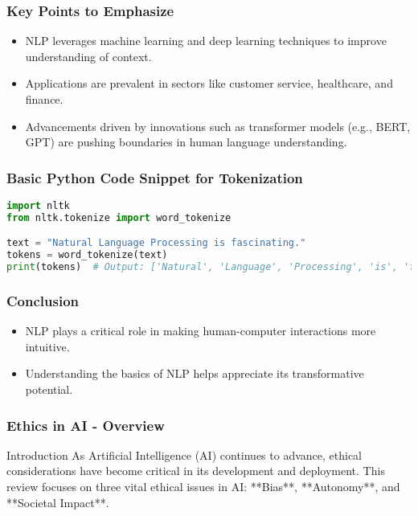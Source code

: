 \documentclass[aspectratio=169]{beamer}
\begin{document}
\begin{frame}
    \frametitle{Key Points to Emphasize}
    \begin{itemize}
        \item NLP leverages machine learning and deep learning techniques to improve understanding of context.
        \item Applications are prevalent in sectors like customer service, healthcare, and finance.
        \item Advancements driven by innovations such as transformer models (e.g., BERT, GPT) are pushing boundaries in human language understanding.
    \end{itemize}
\end{frame}

\begin{frame}[fragile]
    \frametitle{Basic Python Code Snippet for Tokenization}
    \begin{lstlisting}[language=Python]
import nltk
from nltk.tokenize import word_tokenize

text = "Natural Language Processing is fascinating."
tokens = word_tokenize(text)
print(tokens)  # Output: ['Natural', 'Language', 'Processing', 'is', 'fascinating', '.']
    \end{lstlisting}
\end{frame}

\begin{frame}
    \frametitle{Conclusion}
    \begin{itemize}
        \item NLP plays a critical role in making human-computer interactions more intuitive.
        \item Understanding the basics of NLP helps appreciate its transformative potential.
    \end{itemize}
\end{frame}

\begin{frame}[fragile]
    \frametitle{Ethics in AI - Overview}
    \begin{block}{Introduction}
        As Artificial Intelligence (AI) continues to advance, ethical considerations have become critical in its development and deployment.
        This review focuses on three vital ethical issues in AI: **Bias**, **Autonomy**, and **Societal Impact**.
    \end{block}
\end{frame}
\end{document}
